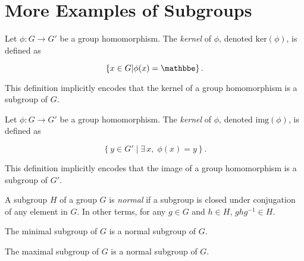 \section{More Examples of Subgroups}

\begin{definition}
    \label{definition : Kernel}
    \leanok
    Let $\phi : G \rightarrow G'$ be a group homomorphism. The \textit{kernel} of $\phi$, denoted $\text{ker}(\phi)$, is defined as

    $$\left\{ x \in G \middle| \phi(x) = \mathbbe \right\}.$$

    This definition implicitly encodes that the kernel of a group homomorphism is a subgroup of $G$.
\end{definition}

\begin{definition}
    \label{definition : Image}
    \leanok
    Let $\phi : G \rightarrow G'$ be a group homomorphism. The \textit{kernel} of $\phi$, denoted $\text{img}(\phi)$, is defined as

    $$\left\{ y \in G' \middle| \exists\,x,\;\phi(x) = y \right\}.$$

    This definition implicitly encodes that the image of a group homomorphism is a subgroup of $G'$.
\end{definition}

\begin{definition}
    \label{definition : normal}
    \leanok
    A subgroup $H$ of a group $G$ is \textit{normal} if a subgroup is closed under conjugation of any element in $G$. In other terms, for any $g \in G$ and $h \in H$, $ghg^{-1} \in H$.
\end{definition}

\begin{theorem}
    \label{theorem : Minimal_normal}
    \leanok
    The minimal subgroup of $G$ is a normal subgroup of $G$.
\end{theorem}

\begin{theorem}
    \label{theorem : Maximal_normal}
    \leanok
    The maximal subgroup of $G$ is a normal subgroup of $G$.
\end{theorem}

